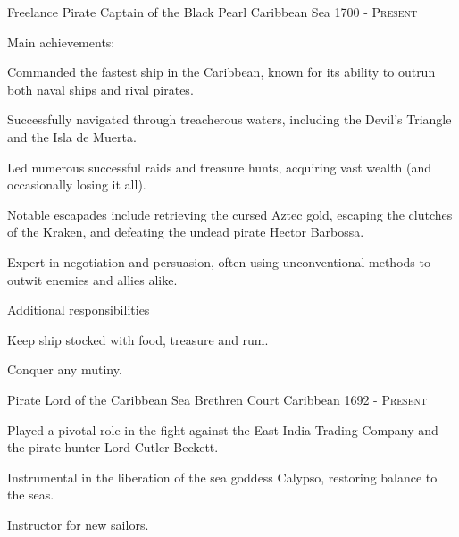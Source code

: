 


\begin{cventries}


\cventry
{Freelance Pirate} %
{Captain of the Black Pearl} %
{Caribbean Sea} %
{1700 - \textsc{Present}} %
{
\begin{cvitems}
\setlength{\itemsep}{1ex}%
%
\item Main achievements:
\begin{cvitemsnested}
    \item{Commanded the fastest ship in the Caribbean, known for its ability to outrun both naval ships and rival pirates.}
    \item{Successfully navigated through treacherous waters, including the Devil's Triangle and the Isla de Muerta.}
    \item{Led numerous successful raids and treasure hunts, acquiring vast wealth (and occasionally losing it all).}
    \item{Notable escapades include retrieving the cursed Aztec gold, escaping the clutches of the Kraken, and defeating the undead pirate Hector Barbossa.}
    \item{Expert in negotiation and persuasion, often using unconventional methods to outwit enemies and allies alike.}
\end{cvitemsnested}
\item Additional responsibilities
    \begin{cvitemsnested}
    \item {Keep ship stocked with food, treasure and rum.}
    \item {Conquer any mutiny.}
    \end{cvitemsnested}
\end{cvitems}
}

\cventry
{Pirate Lord of the Caribbean Sea} %
{Brethren Court} %
{Caribbean } %
{1692 - \textsc{Present}} %
{
\begin{cvitems}
\setlength{\itemsep}{1ex} %
%
\item {Played a pivotal role in the fight against the East India Trading Company and the pirate hunter Lord Cutler Beckett. \hfill {}}
\item {Instrumental in the liberation of the sea goddess Calypso, restoring balance to the seas. \hfill {}}
\item {Instructor for new sailors.}
\end{cvitems}
}


\end{cventries}
